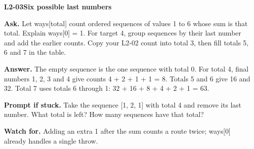 \documentclass[11pt,a4paper]{article}
\begin{document}
\noindent\begin{minipage}{\textwidth}
{\color{teal}\textbf{L2-03}}\quad \textbf{Six possible last numbers}\par\smallskip
\textbf{Ask.} Let ways[total] count ordered sequences of values 1 to 6 whose sum is that total. Explain ways[0] = 1. For target 4, group sequences by their last number and add the earlier counts. Copy your L2-02 count into total 3, then fill totals 5, 6 and 7 in the table.\par\smallskip
\textbf{Answer.} The empty sequence is the one sequence with total 0. For total 4, final numbers 1, 2, 3 and 4 give counts 4 + 2 + 1 + 1 = 8. Totals 5 and 6 give 16 and 32. Total 7 uses totals 6 through 1: 32 + 16 + 8 + 4 + 2 + 1 = 63.\par\smallskip
\textbf{Prompt if stuck.} Take the sequence [1, 2, 1] with total 4 and remove its last number. What total is left? How many sequences have that total?\par\smallskip
\textbf{Watch for.} Adding an extra 1 after the sum counts a route twice; ways[0] already handles a single throw.
\end{minipage}\par{}\medskip
\end{document}
